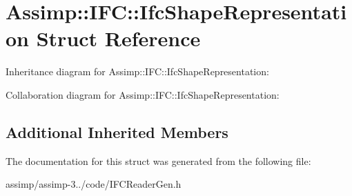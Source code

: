 \hypertarget{struct_assimp_1_1_i_f_c_1_1_ifc_shape_representation}{\section{Assimp\+:\+:I\+F\+C\+:\+:Ifc\+Shape\+Representation Struct Reference}
\label{struct_assimp_1_1_i_f_c_1_1_ifc_shape_representation}
}


Inheritance diagram for Assimp\+:\+:I\+F\+C\+:\+:Ifc\+Shape\+Representation\+:


Collaboration diagram for Assimp\+:\+:I\+F\+C\+:\+:Ifc\+Shape\+Representation\+:
\subsection*{Additional Inherited Members}


The documentation for this struct was generated from the following file\+:\begin{DoxyCompactItemize}
\item 
assimp/assimp-\/3../code/I\+F\+C\+Reader\+Gen.\+h\end{DoxyCompactItemize}
